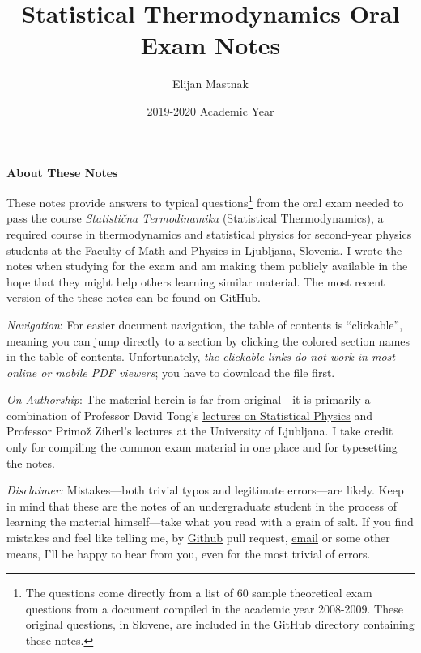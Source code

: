 \documentclass[11pt, a4paper]{article}
\begin{document}
\vspace{-10mm}
\title{Statistical Thermodynamics Oral Exam Notes}
\author{Elijan Mastnak}
\date{2019-2020 Academic Year}
\maketitle

\begin{center}
\textbf{About These Notes}
\end{center}
These notes provide answers to typical questions\footnote{The questions come directly from a list of 60 sample theoretical exam questions from a document compiled in the academic year 2008-2009. These original questions, in Slovene, are included in the \href{https://github.com/ejmastnak/fmf/tree/main/statistical-thermodynamics/std-oral-exam-notes}{\underline{GitHub directory}} containing these notes.} from the oral exam needed to pass the course \textit{Statisti\v{c}na Termodinamika} (Statistical Thermodynamics), a required course in thermodynamics and statistical physics for second-year physics students at the Faculty of Math and Physics in Ljubljana, Slovenia. I wrote the notes when studying for the exam and am making them publicly available in the hope that they might help others learning similar material. The most recent version of the these notes can be found on \href{https://github.com/ejmastnak/fmf/tree/main/statistical-thermodynamics}{\underline{GitHub}}.

\vspace{2mm}
\textit{Navigation}: For easier document navigation, the table of contents is ``clickable'', meaning you can jump directly to a section by clicking the colored section names in the table of contents. Unfortunately, \textit{the clickable links do not work in most online or mobile PDF viewers}; you have to download the file first.

\vspace{2mm}
\textit{On Authorship}: The material herein is far from original---it is primarily a combination of Professor David Tong's \href{http://www.damtp.cam.ac.uk/user/tong/statphys.html}{\underline{lectures on Statistical Physics}} and Professor Primo\v{z} Ziherl's lectures at the University of Ljubljana. I take credit only for compiling the common exam material in one place and for typesetting the notes.

\vspace{2mm}
\textit{Disclaimer:} Mistakes---both trivial typos and legitimate errors---are likely. Keep in mind that these are the notes of an undergraduate student in the process of learning the material himself---take what you read with a grain of salt. If you find mistakes and feel like telling me, by \href{https://github.com/ejmastnak/fmf}{Github} pull request, \href{mailto:ejmastnak@gmail.com}{email} or some other means, I'll be happy to hear from you, even for the most trivial of errors.
\end{document}
